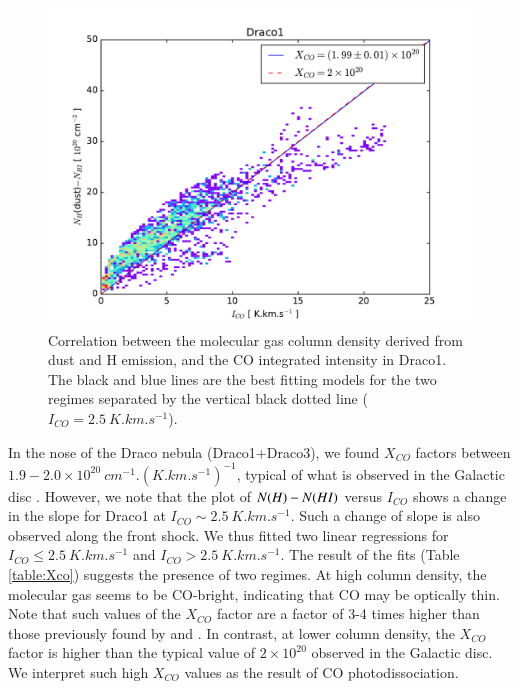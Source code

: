 \documentclass[traditabstract]{aa}
\begin{document}
\begin{figure}[h!]
  \centering
  \includegraphics[page=2,width=\linewidth,trim=30 10 50 25,clip=true]{Figures/dust-CO_comparison.pdf}
  \caption{\label{Xco} Correlation between the molecular gas column density derived from dust and H emission, and the CO integrated intensity in Draco1. The black and blue lines are the best fitting models for the two regimes separated by the vertical black dotted line ($I_{CO}=2.5\: K.km.s^{-1}$).}
\end{figure}

In the nose of the Draco nebula (Draco1+Draco3), we found $X_{CO}$ factors between $1.9-2.0\times 10^{20}\: cm^{-1}.(K.km.s^{-1})^{-1}$, typical of what is observed in the Galactic disc \citep{Bolatto_2013}. However, we note that the plot of $N(H)-N(H\rmnum{1})$ versus $I_{CO}$ shows a change in the slope for Draco1 at $I_{CO}\sim 2.5\: K.km.s^{-1}$. Such a change of slope is also observed along the front shock. We thus fitted two linear regressions for $I_{CO}\leq 2.5\: K.km.s^{-1}$ and $I_{CO}>2.5\: K.km.s^{-1}$. The result of the fits (Table \ref{table:Xco}) suggests the presence of two regimes.
At high column density, the molecular gas seems to be CO-bright, indicating that CO may be optically thin. Note that such values of the $X_{CO}$ factor are a factor of 3-4 times higher than those previously found by \cite{Herbstmeier_1993} and \cite{Moritz_1998}.
In contrast, at lower column density, the $X_{CO}$ factor is higher than the typical value of $2\times 10^{20}$ observed in the Galactic disc. We interpret such high $X_{CO}$ values as the result of CO photodissociation.
\end{document}
